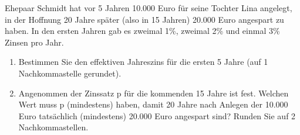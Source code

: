 \begin{Aufgabe}[3] 
Ehepaar Schmidt hat vor 5 Jahren 10.000 Euro für seine Tochter Lina angelegt, in der Hoffnung 20 Jahre später (also in 15 Jahren) 20.000 Euro angespart zu haben. In den ersten Jahren gab es zweimal 1\%, zweimal 2\% und einmal 3\% Zinsen pro Jahr.
\begin{enumerate}
	\item Bestimmen Sie den effektiven Jahreszins für die ersten 5 Jahre (auf 1 Nachkommastelle gerundet).
	\item Angenommen der Zinssatz p für die kommenden 15 Jahre ist fest. Welchen Wert muss p (mindestens) haben, damit 20 Jahre nach Anlegen der 10.000 Euro tatsächlich (mindestens) 20.000 Euro angespart sind? Runden Sie auf 2 Nachkommastellen.
\end{enumerate}
	
\end{Aufgabe}


\newpage

\endinput